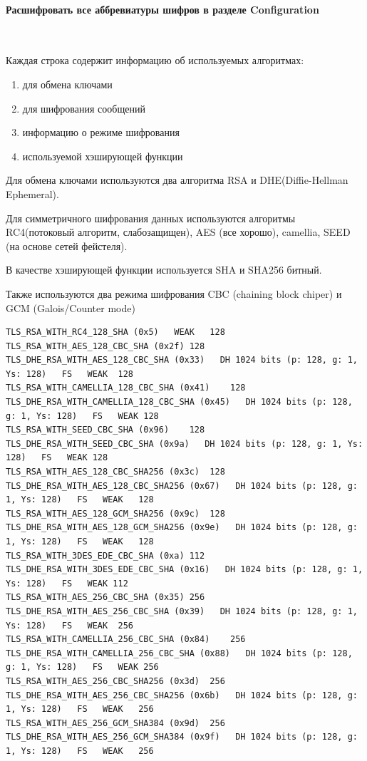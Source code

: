 \documentclass{article}
\begin{document}
\paragraph{Расшифровать все аббревиатуры шифров в разделе Configuration}
~

Каждая строка содержит информацию об используемых алгоритмах:
\begin{enumerate}
\item для обмена ключами
\item для шифрования сообщений
\item информацию о режиме шифрования
\item используемой хэширующей функции
\end{enumerate}

Для обмена ключами используются два алгоритма RSA и DHE(Diffie-Hellman Ephemeral).

Для симметричного шифрования данных используются алгоритмы RC4(потоковый алгоритм, слабозащищен), AES (все хорошо), camellia, SEED (на основе сетей фейстеля).

В качестве хэширующей функции используется SHA и SHA256 битный.

Также используются два режима шифрования CBC  (chaining block chiper) и GCM (Galois/Counter mode)
\small
\begin{verbatim}
TLS_RSA_WITH_RC4_128_SHA (0x5)   WEAK	128
TLS_RSA_WITH_AES_128_CBC_SHA (0x2f)	128
TLS_DHE_RSA_WITH_AES_128_CBC_SHA (0x33)   DH 1024 bits (p: 128, g: 1, Ys: 128)   FS   WEAK	128
TLS_RSA_WITH_CAMELLIA_128_CBC_SHA (0x41)	128
TLS_DHE_RSA_WITH_CAMELLIA_128_CBC_SHA (0x45)   DH 1024 bits (p: 128, g: 1, Ys: 128)   FS   WEAK	128
TLS_RSA_WITH_SEED_CBC_SHA (0x96)	128
TLS_DHE_RSA_WITH_SEED_CBC_SHA (0x9a)   DH 1024 bits (p: 128, g: 1, Ys: 128)   FS   WEAK	128
TLS_RSA_WITH_AES_128_CBC_SHA256 (0x3c)	128
TLS_DHE_RSA_WITH_AES_128_CBC_SHA256 (0x67)   DH 1024 bits (p: 128, g: 1, Ys: 128)   FS   WEAK	128
TLS_RSA_WITH_AES_128_GCM_SHA256 (0x9c)	128
TLS_DHE_RSA_WITH_AES_128_GCM_SHA256 (0x9e)   DH 1024 bits (p: 128, g: 1, Ys: 128)   FS   WEAK	128
TLS_RSA_WITH_3DES_EDE_CBC_SHA (0xa)	112
TLS_DHE_RSA_WITH_3DES_EDE_CBC_SHA (0x16)   DH 1024 bits (p: 128, g: 1, Ys: 128)   FS   WEAK	112
TLS_RSA_WITH_AES_256_CBC_SHA (0x35)	256
TLS_DHE_RSA_WITH_AES_256_CBC_SHA (0x39)   DH 1024 bits (p: 128, g: 1, Ys: 128)   FS   WEAK	256
TLS_RSA_WITH_CAMELLIA_256_CBC_SHA (0x84)	256
TLS_DHE_RSA_WITH_CAMELLIA_256_CBC_SHA (0x88)   DH 1024 bits (p: 128, g: 1, Ys: 128)   FS   WEAK	256
TLS_RSA_WITH_AES_256_CBC_SHA256 (0x3d)	256
TLS_DHE_RSA_WITH_AES_256_CBC_SHA256 (0x6b)   DH 1024 bits (p: 128, g: 1, Ys: 128)   FS   WEAK	256
TLS_RSA_WITH_AES_256_GCM_SHA384 (0x9d)	256
TLS_DHE_RSA_WITH_AES_256_GCM_SHA384 (0x9f)   DH 1024 bits (p: 128, g: 1, Ys: 128)   FS   WEAK	256
\end{verbatim}
\end{document}
